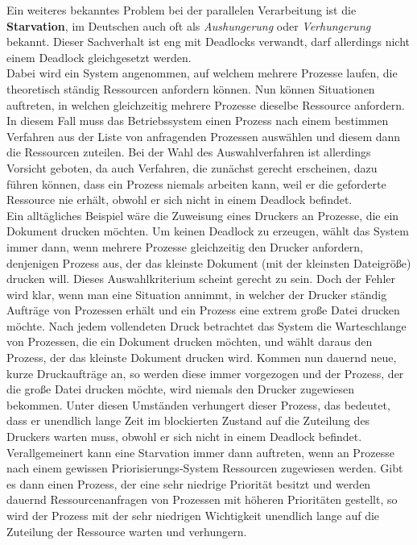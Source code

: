 				Ein weiteres bekanntes Problem bei der parallelen Verarbeitung ist die \textbf{Starvation}, im Deutschen auch oft als \textit{Aushungerung} oder \textit{Verhungerung} bekannt. Dieser Sachverhalt ist eng mit Deadlocks verwandt, darf allerdings nicht einem Deadlock gleichgesetzt werden.\\
				Dabei wird ein System angenommen, auf welchem mehrere Prozesse laufen, die theoretisch ständig Ressourcen anfordern können. Nun können Situationen auftreten, in welchen gleichzeitig mehrere Prozesse dieselbe Ressource anfordern. In diesem Fall muss das Betriebssystem einen Prozess nach einem bestimmen Verfahren aus der Liste von anfragenden Prozessen auswählen und diesem dann die Ressourcen zuteilen. Bei der Wahl des Auswahlverfahren ist allerdings Vorsicht geboten, da auch Verfahren, die zunächst gerecht erscheinen, dazu führen können, dass ein Prozess niemals arbeiten kann, weil er die geforderte Ressource nie erhält, obwohl er sich nicht in einem Deadlock befindet.\\
				Ein alltägliches Beispiel wäre die Zuweisung eines Druckers an Prozesse, die ein Dokument drucken möchten. Um keinen Deadlock zu erzeugen, wählt das System immer dann, wenn mehrere Prozesse gleichzeitig den Drucker anfordern, denjenigen Prozess aus, der das kleinste Dokument (mit der kleinsten Dateigröße) drucken will. Dieses Auswahlkriterium scheint gerecht zu sein. Doch der Fehler wird klar, wenn man eine Situation annimmt, in welcher der Drucker ständig Aufträge von Prozessen erhält und ein Prozess eine extrem große Datei drucken möchte. Nach jedem vollendeten Druck betrachtet das System die Warteschlange von Prozessen, die ein Dokument drucken möchten, und wählt daraus den Prozess, der das kleinste Dokument drucken wird. Kommen nun dauernd neue, kurze Druckaufträge an, so werden diese immer vorgezogen und der Prozess, der die große Datei drucken möchte, wird niemals den Drucker zugewiesen bekommen. Unter diesen Umständen verhungert dieser Prozess, das bedeutet, dass er unendlich lange Zeit im blockierten Zustand auf die Zuteilung des Druckers warten muss, obwohl er sich nicht in einem Deadlock befindet.\\
				Verallgemeinert kann eine Starvation immer dann auftreten, wenn an Prozesse nach einem gewissen Priorisierungs-System Ressourcen zugewiesen werden. Gibt es dann einen Prozess, der eine sehr niedrige Priorität besitzt und werden dauernd Ressourcenanfragen von Prozessen mit höheren Prioritäten gestellt, so wird der Prozess mit der sehr niedrigen Wichtigkeit unendlich lange auf die Zuteilung der Ressource warten und verhungern. \cite{ModerneBetriebssysteme}
			
